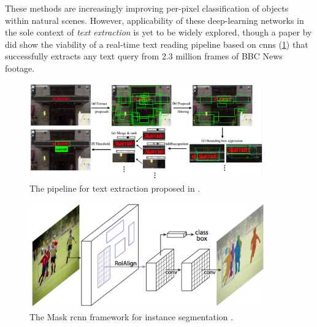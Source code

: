 These methods are increasingly improving per-pixel classification of objects within natural scenes. However, applicability of these deep-learning networks in the sole context of \textit{text extraction} is yet to be widely explored, though a \citeyear{Jaderberg:2016wj} paper by \citet{Jaderberg:2016wj} did show the viability of a real-time text reading pipeline based on \glspl{cnn} (\cref{fig:background:detection:learning:jaderberg2016_cnn}) that successfully extracts any text query from 2.3 million frames of BBC News footage.

\begin{figure}[p]
  \centering 
  \includegraphics[width=0.9\textwidth]{images/background/jaderberg2016_cnn}
  \caption[A pipeline for text extraction using CNNs]{The pipeline for text extraction proposed in \citep{Jaderberg:2016wj}.}
  \label{fig:background:detection:learning:jaderberg2016_cnn}
\end{figure}

\begin{figure}[p]
  \centering
  \includegraphics[width=0.9\textwidth]{images/background/he2017_maskrcnnframework}
  \caption[The Mask R-CNN framework for instance segmentation]{The Mask \gls{rcnn} framework for instance segmentation \citep{He:2017ud}.}
  \label{fig:background:detection:learning:he2017_maskrcnnframework}
\end{figure}

